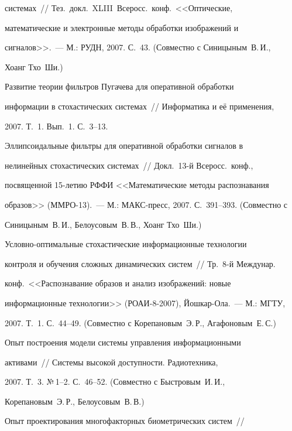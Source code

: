 системах~// Тез.\ докл.\ XLIII~Всеросс.\ конф.\ <<Оптические,


математические и электронные методы обработки изоб\-ра\-же\-ний и


сигналов>>.~--- М.: РУДН, 2007. С.~43. (Совместно с Синицыным~В.\,И.,


Хоанг Тхо~Ши.)





 Развитие теории фильтров Пугачева для оперативной обработки


информации в стохастических системах~// Информатика и её применения,


2007. Т.~1. Вып.~1. С.~3--13.





 Эллипсоидальные фильтры для оперативной обработки сигналов в


нелинейных стохастических системах~// Докл.\ 13-й Всеросс.\ конф.,


посвященной 15-ле\-тию РФФИ <<Математические методы распознавания


образов>> (ММРО-13).~--- М.: МАКС-пресс, 2007. С.~391--393. (Совместно с


Синицыным~В.\,И., Белоусовым~В.\,В., Хоанг Тхо~Ши.)





 Условно-оптимальные стохастические информационные технологии


контроля и обучения сложных динамических систем~// Тр.\ 8-й Междунар.\


конф.\ <<Распознавание образов и анализ изоб\-ра\-же\-ний: новые


информационные технологии>> (РОАИ-8-2007), Йошкар-Ола.~--- М.: МГТУ,


2007. Т.~1. С.~44--49. (Совместно с Корепановым~Э.\,Р., Агафоновым~Е.\,С.)





 Опыт построения модели системы управления информационными


активами~// Системы высокой доступности. Радиотехника,


 2007. Т.~3. №\,1--2. С.~46--52. (Совместно с Быстровым~И.\,И.,


Корепановым~Э.\,Р., Белоусовым~В.\,В.)





 Опыт проектирования многофакторных биометрических систем~//


